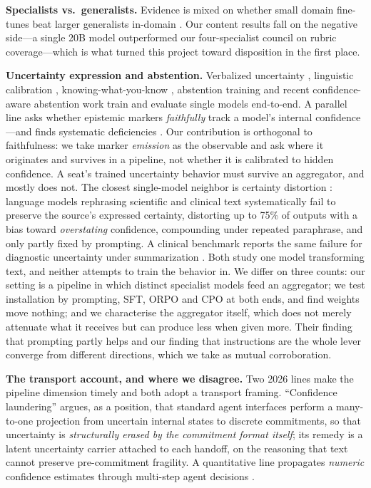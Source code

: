 \documentclass[11pt]{article}
\begin{document}
\textbf{Specialists vs.\ generalists.} Evidence is mixed on whether small
domain fine-tunes beat larger generalists in-domain \cite{trident,medftrag}.
Our content results fall on the negative side---a single 20B model outperformed
our four-specialist council on rubric coverage---which is what turned this
project toward disposition in the first place.

\textbf{Uncertainty expression and abstention.} Verbalized uncertainty \cite{lin2022}, linguistic calibration \cite{mielke2022}, knowing-what-you-know \cite{kadavath2022}, abstention training \cite{rtuning} and recent confidence-aware abstention work \cite{icalm,bas} train and evaluate single models end-to-end. A parallel line asks whether epistemic markers \emph{faithfully} track a model's internal confidence---and finds systematic deficiencies \cite{markerfaith,rhetmiscal,markerrel}. Our contribution is orthogonal to faithfulness: we take marker \emph{emission} as the observable and ask where it originates and survives in a pipeline, not whether it is calibrated to hidden confidence. A seat's trained uncertainty behavior must survive an aggregator, and mostly does not. The closest single-model neighbor is certainty distortion \cite{certdist}:
language models rephrasing scientific and clinical text systematically fail to
preserve the source's expressed certainty, distorting up to 75\% of outputs
with a bias toward \emph{overstating} confidence, compounding under repeated
paraphrase, and only partly fixed by prompting. A clinical benchmark reports
the same failure for diagnostic uncertainty under summarization
\cite{possdef}. Both study one model transforming text, and neither attempts
to train the behavior in. We differ on three counts: our setting is a pipeline
in which distinct specialist models feed an aggregator; we test installation
by prompting, SFT, ORPO and CPO at both ends, and find weights move nothing;
and we characterise the aggregator itself, which does not merely attenuate
what it receives but can produce less when given more. Their finding that
prompting partly helps and our finding that instructions are the whole lever
converge from different directions, which we take as mutual corroboration.

\textbf{The transport account, and where we disagree.} Two 2026 lines make the
pipeline dimension timely and both adopt a transport framing. ``Confidence
laundering'' \cite{laundering} argues, as a position, that standard agent
interfaces perform a many-to-one projection from uncertain internal states to
discrete commitments, so that uncertainty is \emph{structurally erased by the
commitment format itself}; its remedy is a latent uncertainty carrier attached
to each handoff, on the reasoning that text cannot preserve pre-commitment
fragility. A quantitative line propagates \emph{numeric} confidence estimates
through multi-step agent decisions \cite{uprop}.
\end{document}
